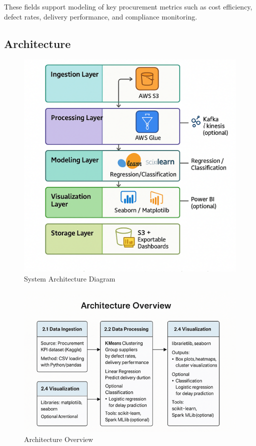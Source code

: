\documentclass[10pt, twocolumn]{article}
\begin{document}
These fields support modeling of key procurement metrics such as cost efficiency, defect rates, delivery performance, and compliance monitoring.
 

\subsection{Architecture}

\begin{figure}[H]
    \centering
    \includegraphics[width=1\linewidth]{Images/system_architecture_diagram.png}
    \caption{System Architecture Diagram}
    \label{fig:system_architecture_diagram}
\end{figure}

\begin{figure}[H]
    \centering
    \includegraphics[width=1\linewidth]{Images/architecture_overview.png}
    \caption{Architecture Overview}
    \label{fig:architecture_overview}
\end{figure}
\end{document}
